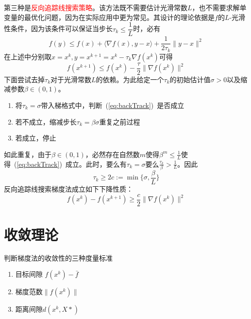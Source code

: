 第三种是\textcolor{red}{反向追踪线搜索策略}。该方法既不需要估计光滑常数$L$，也不需要求解单变量的最优化问题，因为在实际应用中更为常见。其设计的理论依据是$f$的$L$-光滑性条件，因为该条件可以保证当步长$\tau_k\leq \dfrac{1}{L}$时，必有
\[
    f(y) \leq f(x)+\langle \nabla f(x),y-x \rangle + \dfrac{1}{2\tau_k}\|y-x\|^2
\]
在上述中分别取$x= x^k,y = x^{k+1} = x^{k}-\tau_k \nabla f(x^k)$可得
\begin{equation}\label{eq:backTrack}
    f(x^{k+1})\leq f(x^k)-\frac{\tau}{2}\| \nabla f(x^k) \|^2
\end{equation}
下面尝试去掉$\tau_k$对于光滑常数$L$的依赖。为此给定一个$\tau_k$的初始估计值$\sigma>0$以及缩减参数$\beta\in (0,1)$。
\begin{enumerate}
    \item 将$\tau_k =\sigma$带入梯格式中，判断~(\ref{eq:backTrack})~是否成立
    \item 若不成立，缩减步长$\tau_k = \beta\sigma$重复之前过程
    \item 若成立，停止
\end{enumerate}
如此重复，由于$\beta\in (0,1)$，必然存在自然数$m$使得$\beta^m\leq \frac{1}{L}$使得~(\ref{eq:backTrack})~成立。此时，要么有$\tau_k = \sigma$要么$\frac{\tau_k}{\beta}>\frac{1}{L}$。因此
\[
    \tau_k\geq 2c:=\min\{ \sigma,\frac{\beta}{L} \}
\]
反向追踪线搜索梯度法成立如下下降性质：
\begin{equation}\label{eq:backTrackResult}
    f(x^k)-f(x^{k+1})\geq \frac{c}{2}\|\nabla f(x^{k})\|^2
\end{equation}
\section{收敛理论}
判断梯度法的收敛性的三种度量标准
\begin{enumerate}
    \item 目标间隙 $f(x^k)-\bar{f}$
    \item 梯度范数$\|f(x^k)\|$
    \item 距离间隙$d(x^k,X*)$
\end{enumerate}
